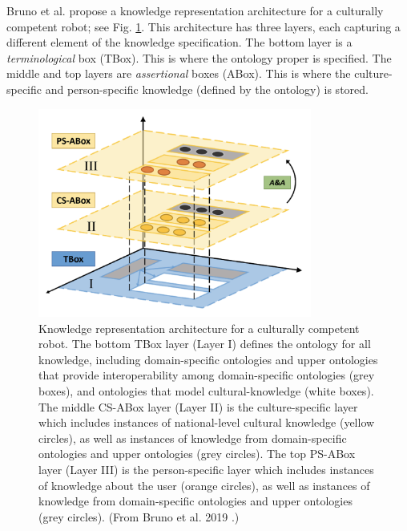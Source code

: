 \documentclass{CSSRforAfrica}
\begin{document}
Bruno et al. \cite{Brunoetal2019} propose a knowledge representation architecture for a culturally competent robot; see Fig. \ref{fig:knowledge_representation_architecture}.  This architecture has three layers, each capturing a different element of the knowledge specification. The bottom layer is a {\em terminological} box (TBox). This is where the ontology proper is specified.  The middle and top layers are {\em assertional} boxes (ABox). This is where the culture-specific and person-specific knowledge (defined by the ontology) is stored.  


\begin{figure}[tb]
\begin{center}
\vspace{-5mm}
\includegraphics[width=90mm,angle=0]{Knowledge_Representation_Architecture.png}
\end{center}
\vspace{-5mm}
\caption{Knowledge representation architecture for a culturally competent robot. The bottom TBox layer (Layer I) defines the ontology for all knowledge, including domain-specific ontologies and upper ontologies that provide interoperability among domain-specific ontologies  (grey boxes), and ontologies that model cultural-knowledge  (white boxes). The middle CS-ABox layer (Layer II) is the  culture-specific layer which includes instances of national-level cultural knowledge  (yellow circles), as well as instances of knowledge from domain-specific ontologies and upper ontologies (grey circles).  The top PS-ABox layer (Layer III) is the person-specific  layer which includes instances of knowledge about the user (orange circles),  as well as instances of knowledge from domain-specific ontologies and upper ontologies (grey circles). (From Bruno et al. 2019 \cite{Brunoetal2019}.)}
\label{fig:knowledge_representation_architecture}       
\end{figure}
\end{document}

